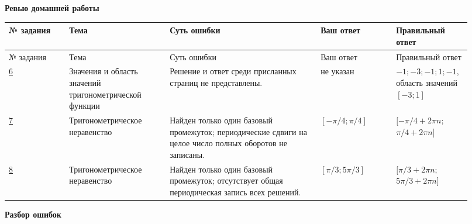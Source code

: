 \documentclass[12pt,a4paper]{article}
\begin{document}
\thispagestyle{empty}
\vspace*{\fill}
\begin{center}{\LARGE\bfseries Ревью домашней работы\par}\vspace{1.1cm}{\large Автор: Лёвин Артём Александрович\par}\vspace{0.6cm}{\large 3 октября 2026 года\par}\end{center}
\vspace*{\fill}
\begin{center}\end{center}
\newpage
{\small\setlength{\tabcolsep}{2pt}
\begin{longtable}{>{\raggedright\arraybackslash}p{0.12\linewidth}>{\raggedright\arraybackslash}p{0.20\linewidth}>{\raggedright\arraybackslash}p{0.30\linewidth}>{\raggedright\arraybackslash}p{0.15\linewidth}>{\raggedright\arraybackslash}p{0.15\linewidth}}
\toprule № задания & Тема & Суть ошибки & Ваш ответ & Правильный ответ\\\midrule\endfirsthead
\toprule № задания & Тема & Суть ошибки & Ваш ответ & Правильный ответ\\\midrule\endhead
\hyperref[task:6]{6} & Значения и область значений тригонометри\-ческой функции & Решение и ответ среди присланных страниц не представлены. & не указан & $-1;-3;-1;1;-1$, область значений $[-3;1]$\\\midrule
\hyperref[task:7]{7} & Тригонометри\-ческое неравенство & Найден только один базовый промежуток; периодические сдвиги на целое число полных оборотов не записаны. & $[-\pi/4;\pi/4]$ & $[-\pi/4+2\pi n;$\newline$\pi/4+2\pi n]$\\\midrule
\hyperref[task:8]{8} & Тригонометри\-ческое неравенство & Найден только один базовый промежуток; отсутствует общая периодическая запись всех решений. & $[\pi/3;5\pi/3]$ & $[\pi/3+2\pi n;$\newline$5\pi/3+2\pi n]$\\\bottomrule
\end{longtable}}
\newpage
\thispagestyle{empty}\vspace*{\fill}\begin{center}{\LARGE\bfseries Разбор ошибок}\end{center}\vspace*{\fill}\newpage
\end{document}
